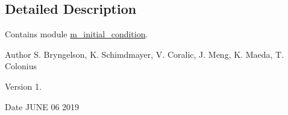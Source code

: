 \subsection{Detailed Description}
Contains module \hyperlink{namespacem__initial__condition}{m\+\_\+initial\+\_\+condition}. 

\begin{DoxyAuthor}{Author}
S. Bryngelson, K. Schimdmayer, V. Coralic, J. Meng, K. Maeda, T. Colonius 
\end{DoxyAuthor}
\begin{DoxyVersion}{Version}
1. 
\end{DoxyVersion}
\begin{DoxyDate}{Date}
J\+U\+NE 06 2019 
\end{DoxyDate}
